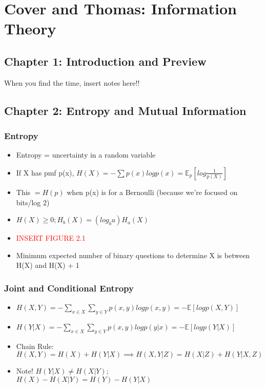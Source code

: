 \documentclass[leqno,twocolumn]{article}
\begin{document}
\section{Cover and Thomas: Information Theory}
\subsection{Chapter 1: Introduction and Preview}
When you find the time, insert notes here!!

\subsection{Chapter 2: Entropy and Mutual Information}
\subsubsection{Entropy}
\begin{itemize}
\item Entropy = uncertainty in a random variable
\item If X has pmf p(x), $H(X) = -\sum p(x) log p(x) = \mathbb{E}_p [log \frac{1}{p(X)}]$
\item This $ = H(p)$ when p(x) is for a Bernoulli (because we're focused on bits/log 2)
\item $H(X) \geq 0; H_b(X) = (log_ba)H_a(X)$
\item \textcolor{red}{INSERT FIGURE 2.1}
\item Minimum expected number of binary questions to determine X is between H(X) and H(X) + 1
\end{itemize}

\subsubsection{Joint and Conditional Entropy}
\begin{itemize}
\item $H(X,Y) = - \sum_{x \in X} \sum_{y \in Y} p(x,y) log p(x,y) = - \mathbb{E}[log p(X,Y) ]$
\item $H(Y|X) = - \sum_{x \in X} \sum_{y \in Y} p(x,y) log p(y|x) = - \mathbb{E}[log p(Y|X) ]$
\item Chain Rule: $H(X,Y) = H(X) + H(Y|X) \implies H(X,Y|Z) = H(X|Z) + H(Y|X,Z)$
\item Note! $H(Y|X) \neq H(X|Y);$\\ $H(X) - H(X|Y) = H(Y) - H(Y|X)$
\end{itemize}
\end{document}
